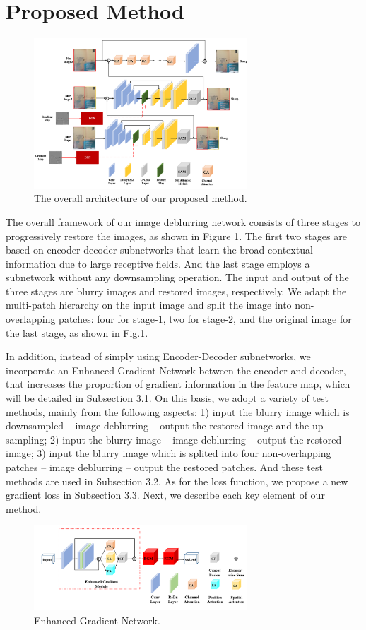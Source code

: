 \begin{sloppypar}
\section{Proposed Method}
\begin{figure}[h]
\centering
\includegraphics[width=8cm]{images/fig1.png}
\caption{The overall architecture of our proposed method.}
\label{fig_sim}
\end{figure}
The overall framework of our image deblurring network consists of three stages to progressively restore the images, as shown in Figure 1. The first two stages are based on encoder-decoder subnetworks that learn the broad contextual information due to large receptive fields. And the last stage employs a subnetwork without any downsampling operation. The input and output of the three stages are blurry images and restored images, respectively. We adapt the multi-patch hierarchy on the input image and split the image into non-overlapping patches: four for stage-1, two for stage-2, and the original image for the last stage, as shown in Fig.1.

In addition, instead of simply using Encoder-Decoder subnetworks, we incorporate an Enhanced Gradient Network between the encoder and decoder, that increases the proportion of gradient information in the feature map, which will be detailed in Subsection 3.1. On this basis, we adopt a variety of test methods, mainly from the
following aspects: 1) input the blurry image which is downsampled -- image deblurring -- output the restored image and the up-sampling; 2) input the blurry image -- image deblurring -- output the restored image; 3) input the blurry image which is splited into four non-overlapping patches -- image deblurring -- output the restored patches. And these test methods are used in Subsection 3.2. As for the loss function, we propose a new gradient loss in Subsection 3.3. Next, we describe each key element of our method.
\begin{figure}[h]
\centering
\includegraphics[width=8cm]{images/fig2.png}
\caption{Enhanced Gradient Network.}
\label{fig_sim}
\end{figure}

\end{sloppypar}
